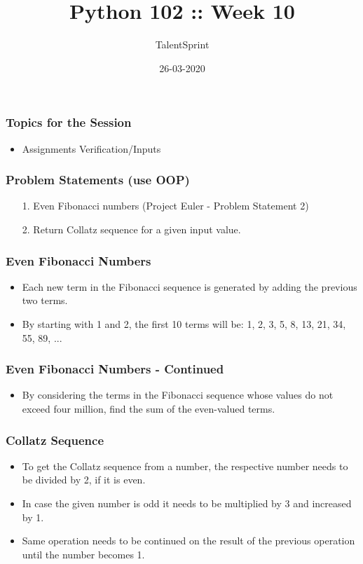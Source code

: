 \documentclass[14pt]{beamer}
\title{Python 102 :: Week 10}
\date{26-03-2020}
\author[TS]{TalentSprint}
\begin{document}
    \begin{frame}
        \titlepage
    \end{frame}
    \begin{frame}
        \frametitle{Topics for the Session}
        \begin{itemize}
            \item Assignments Verification/Inputs
        \end{itemize}
    \end{frame}

    \begin{frame}[containsverbatim]
        \frametitle{Problem Statements (use OOP)}
        \begin{itemize}
        \item[1.] Even Fibonacci numbers (Project Euler - Problem Statement 2)
        \item[2.] Return Collatz sequence for a given input value.
        \end{itemize}
    \end{frame}

    \begin{frame}[containsverbatim]
        \frametitle{Even Fibonacci Numbers}
        \begin{itemize}
        \item Each new term in the Fibonacci sequence is generated by adding the previous two terms. 
        \item By starting with 1 and 2, the first 10 terms will be:        
1, 2, 3, 5, 8, 13, 21, 34, 55, 89, ...
        \end{itemize}
    \end{frame}

    \begin{frame}[containsverbatim]
        \frametitle{Even Fibonacci Numbers - Continued}
        \begin{itemize}
		\item By considering the terms in the Fibonacci sequence whose values do not exceed four million, find the sum of the even-valued terms.
        \end{itemize}
    \end{frame}

    \begin{frame}[containsverbatim]
        \frametitle{Collatz Sequence}
        \begin{itemize}
        \item To get the Collatz sequence from a number, the respective number needs to be divided by 2, if it is even. 
        \item In case the given number is odd it needs to be multiplied by 3 and increased by 1.
        \item Same operation needs to be continued on the result of the previous operation until the number becomes 1.
        \end{itemize}
    \end{frame}
\end{document}
